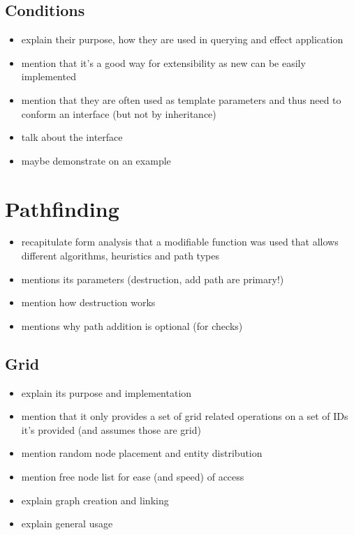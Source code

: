 \subsection{Conditions}

\begin{itemize}
    \item explain their purpose, how they are used in querying and effect application
    \item mention that it's a good way for extensibility as new can be easily implemented
    \item mention that they are often used as template parameters and thus need to
        conform an interface (but not by inheritance)
    \item talk about the interface
    \item maybe demonstrate on an example
\end{itemize}

\section{Pathfinding}

\begin{itemize}
    \item recapitulate form analysis that a modifiable function was used
        that allows different algorithms, heuristics and path types
    \item mentions its parameters (destruction, add path are primary!)
    \item mention how destruction works
    \item mentions why path addition is optional (for checks)
\end{itemize}

\subsection{Grid}

\begin{itemize}
    \item explain its purpose and implementation
    \item mention that it only provides a set of grid related operations
        on a set of IDs it's provided (and assumes those are grid)
    \item mention random node placement and entity distribution
    \item mention free node list for ease (and speed) of access
    \item explain graph creation and linking
    \item explain general usage
\end{itemize}

